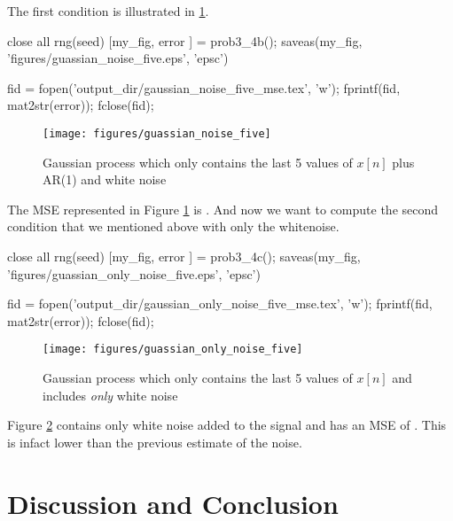 \documentclass[11pt, twoside]{article}   	%
\newenvironment{matlab}{\comment}{\endcomment}
\begin{document}
The first condition is illustrated in \ref{fig:gaussian_noise_five}.

\begin{matlab}
close all 
rng(seed)
[my_fig, error ] = prob3_4b();
saveas(my_fig, 'figures/guassian_noise_five.eps', 'epsc')

fid = fopen('output_dir/gaussian_noise_five_mse.tex', 'w'); 
fprintf(fid, mat2str(error)); 
fclose(fid); 
\end{matlab}

\begin{figure}[h]
\centering
\texttt{[image: figures/guassian\_noise\_five]}
\caption{Gaussian process which only contains the last 5 values of $x[n]$ plus AR(1) and white noise}
\label{fig:gaussian_noise_five} 
\end{figure}
\FloatBarrier

The MSE represented in Figure \ref{fig:gaussian_noise_five} is
. And now we want to compute the
second condition that we mentioned above with only the whitenoise. 

\begin{matlab}
close all 
rng(seed)
[my_fig, error ] = prob3_4c();
saveas(my_fig, 'figures/guassian_only_noise_five.eps', 'epsc')

fid = fopen('output_dir/gaussian_only_noise_five_mse.tex', 'w'); 
fprintf(fid, mat2str(error)); 
fclose(fid); 
\end{matlab}

\begin{figure}[h]
\centering
\texttt{[image: figures/guassian\_only\_noise\_five]}
\caption{Gaussian process which only contains the last 5 values of $x[n]$ and includes \textit{only} white noise}
\label{fig:guassian_only_noise_five} 
\end{figure}
\FloatBarrier

Figure \ref{fig:guassian_only_noise_five} contains only white noise added
to the signal and has an MSE of
. This is infact lower than
the previous estimate of the noise. 

\section{Discussion and Conclusion}



\end{document}

